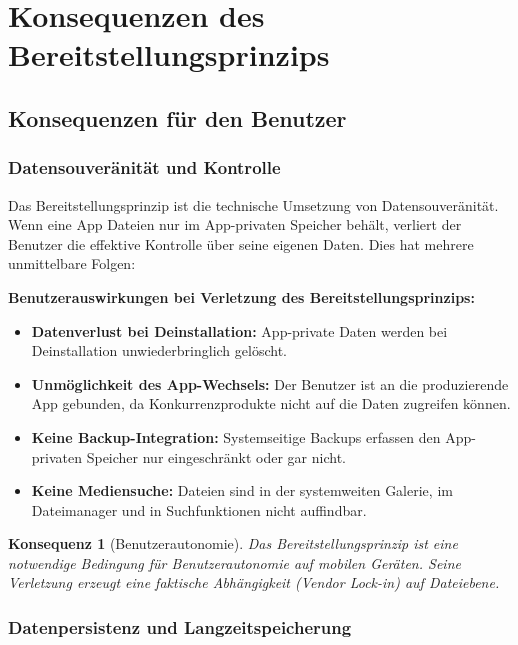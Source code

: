 ﻿\documentclass[12pt, a4paper]{article}
\newtheorem{konsequenz}[definition]{Konsequenz}
\begin{document}
\section{Konsequenzen des Bereitstellungsprinzips}
\label{sec:konsequenzen}

\subsection{Konsequenzen für den Benutzer}

\subsubsection{Datensouveränität und Kontrolle}

Das Bereitstellungsprinzip ist die technische Umsetzung von Datensouveränität.
Wenn eine App Dateien nur im App-privaten Speicher behält, verliert der Benutzer
die effektive Kontrolle über seine eigenen Daten. Dies hat mehrere unmittelbare
Folgen:

\noindent\textbf{Benutzerauswirkungen bei Verletzung des Bereitstellungsprinzips:}
\begin{itemize}[leftmargin=*]
  \item \textbf{Datenverlust bei Deinstallation:} App-private Daten werden bei
    Deinstallation unwiederbringlich gelöscht.
  \item \textbf{Unmöglichkeit des App-Wechsels:} Der Benutzer ist an die
    produzierende App gebunden, da Konkurrenzprodukte nicht auf die Daten
    zugreifen können.
  \item \textbf{Keine Backup-Integration:} Systemseitige Backups erfassen den
    App-privaten Speicher nur eingeschränkt oder gar nicht.
  \item \textbf{Keine Mediensuche:} Dateien sind in der systemweiten Galerie,
    im Dateimanager und in Suchfunktionen nicht auffindbar.
\end{itemize}

\begin{konsequenz}[Benutzerautonomie]
Das Bereitstellungsprinzip ist eine notwendige Bedingung für Benutzerautonomie
auf mobilen Geräten. Seine Verletzung erzeugt eine faktische Abhängigkeit
(\emph{Vendor Lock-in}) auf Dateiebene.
\end{konsequenz}

\subsubsection{Datenpersistenz und Langzeitspeicherung}
\end{document}
